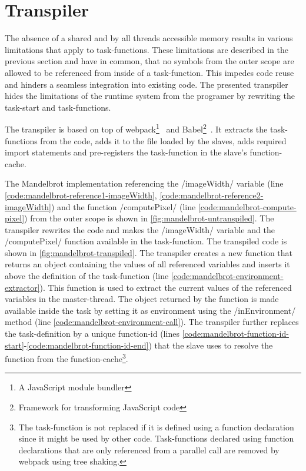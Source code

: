 \section{Transpiler}\label{sec:transpiler}
The absence of a shared and by all threads accessible memory results in various limitations that apply to task-functions. These limitations are described in the previous section and have in common, that no symbols from the outer scope are allowed to be referenced from inside of a task-function. This impedes code reuse and hinders a seamless integration into existing code. The presented transpiler hides the limitations of the runtime system from the programer by rewriting the task-start and task-functions.

The transpiler is based on top of webpack\footnote{A JavaScript module bundler}~\cite{webpack} and Babel\footnote{Framework for transforming JavaScript code}~\cite{babel}. It extracts the task-functions from the code, adds it to the file loaded by the slaves, adds required import statements and pre-registers the task-function in the slave's function-cache. 

The Mandelbrot implementation referencing the \javascriptinline/imageWidth/ variable (line \ref{code:mandelbrot-reference1-imageWidth}, \ref{code:mandelbrot-reference2-imageWidth}) and the function \javascriptinline/computePixel/ (line \ref{code:mandelbrot-compute-pixel}) from the outer scope is shown in \cref{fig:mandelbrot-untranspiled}. The transpiler rewrites the code and makes the \javascriptinline/imageWidth/ variable and the \javascriptinline/computePixel/ function available in the task-function. The transpiled code is shown in \cref{fig:mandelbrot-transpiled}. The transpiler creates a new function that returns an object containing the values of all referenced variables and inserts it above the definition of the task-function (line \ref{code:mandelbrot-environment-extractor}). This function is used to extract the current values of the referenced variables in the master-thread. The object returned by the function is made available inside the task by setting it as environment using the \javascriptinline/inEnvironment/ method (line \ref{code:mandelbrot-environment-call}). The transpiler further replaces the task-definition by a unique function-id (lines \ref{code:mandelbrot-function-id-start}-\ref{code:mandelbrot-function-id-end}) that the slave uses to resolve the function from the function-cache\footnote{The task-function is not replaced if it is defined using a function declaration since it might be used by other code. Task-functions declared using function declarations that are only referenced from a parallel call are removed by webpack using tree shaking.}. 


